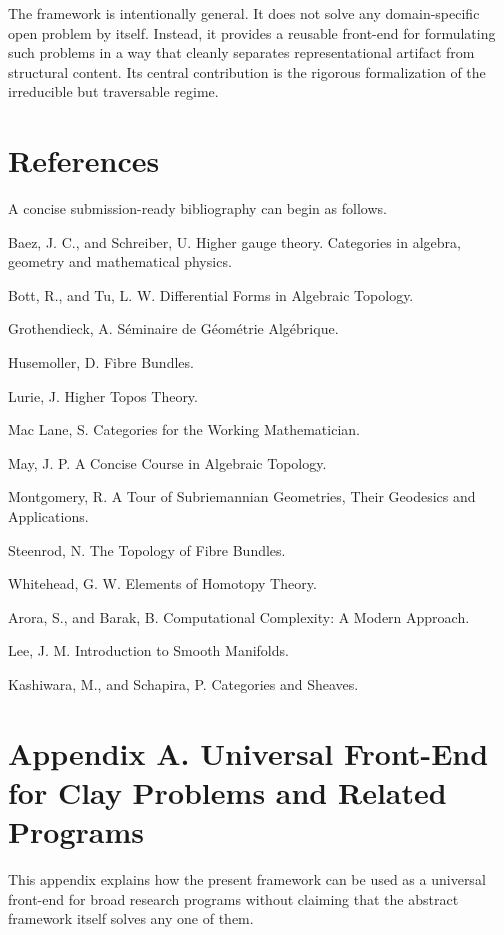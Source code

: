 \documentclass[
]{article}
\begin{document}
The framework is intentionally general. It does not solve any
domain-specific open problem by itself. Instead, it provides a reusable
front-end for formulating such problems in a way that cleanly separates
representational artifact from structural content. Its central
contribution is the rigorous formalization of the irreducible but
traversable regime.

\section{References}\label{references}

A concise submission-ready bibliography can begin as follows.

Baez, J. C., and Schreiber, U. Higher gauge theory. Categories in
algebra, geometry and mathematical physics.

Bott, R., and Tu, L. W. Differential Forms in Algebraic Topology.

Grothendieck, A. Séminaire de Géométrie Algébrique.

Husemoller, D. Fibre Bundles.

Lurie, J. Higher Topos Theory.

Mac Lane, S. Categories for the Working Mathematician.

May, J. P. A Concise Course in Algebraic Topology.

Montgomery, R. A Tour of Subriemannian Geometries, Their Geodesics and
Applications.

Steenrod, N. The Topology of Fibre Bundles.

Whitehead, G. W. Elements of Homotopy Theory.

Arora, S., and Barak, B. Computational Complexity: A Modern Approach.

Lee, J. M. Introduction to Smooth Manifolds.

Kashiwara, M., and Schapira, P. Categories and Sheaves.

\section{Appendix A. Universal Front-End for Clay Problems and Related
Programs}\label{appendix-a.-universal-front-end-for-clay-problems-and-related-programs}

This appendix explains how the present framework can be used as a
universal front-end for broad research programs without claiming that
the abstract framework itself solves any one of them.
\end{document}
